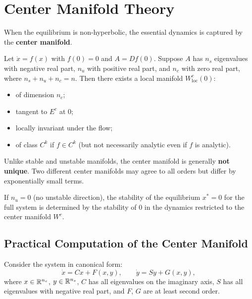 \section{Center Manifold Theory}

When the equilibrium is non-hyperbolic, the essential dynamics is captured
by the \textbf{center manifold}.

\begin{theorem}
\label{thm:center-manifold}
Let $\dot{x} = f(x)$ with $f(0) = 0$ and $A = Df(0)$. Suppose $A$ has $n_s$
eigenvalues with negative real part, $n_u$ with positive real part, and $n_c$
with zero real part, where $n_s + n_u + n_c = n$. Then there exists a local
manifold $W^c_{\mathrm{loc}}(0)$:
\begin{itemize}
    \item of dimension $n_c$;
    \item tangent to $E^c$ at $0$;
    \item locally invariant under the flow;
    \item of class $C^k$ if $f \in C^k$ (but not necessarily analytic even
    if $f$ is analytic).
\end{itemize}
\end{theorem}

\begin{warning}[title=\textbf{Non-uniqueness of the center manifold}]
Unlike stable and unstable manifolds, the center manifold is generally
\textbf{not unique}. Two different center manifolds may agree to all orders
but differ by exponentially small terms.
\end{warning}

\begin{theorem}
\label{thm:center-reduction}
If $n_u = 0$ (no unstable direction), the stability of the equilibrium
$x^* = 0$ for the full system is determined by the stability of $0$ in the
dynamics restricted to the center manifold $W^c$.
\end{theorem}

\subsection{Practical Computation of the Center Manifold}

Consider the system in canonical form:
\[
    \dot{x} = Cx + F(x, y), \qquad \dot{y} = Sy + G(x, y),
\]
where $x \in \mathbb{R}^{n_c}$, $y \in \mathbb{R}^{n_s}$, $C$ has all eigenvalues on the
imaginary axis, $S$ has all eigenvalues with negative real part, and $F$, $G$
are at least second order.

